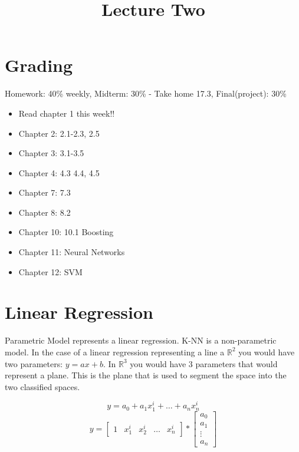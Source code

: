 \documentclass[letter, 9pt]{article}
\title{Lecture Two}
\begin{document}
\maketitle

\section{Grading}
Homework: 40\% weekly, Midterm: 30\% - Take home 17.3, Final(project): 30\%

\begin{itemize}
\item Read chapter 1 this week!!
\item Chapter 2: 2.1-2.3, 2.5
\item Chapter 3: 3.1-3.5
\item Chapter 4: 4.3 4.4, 4.5
\item Chapter 7: 7.3
\item Chapter 8: 8.2
\item Chapter 10: 10.1 Boosting
\item Chapter 11: Neural Networks
\item Chapter 12: SVM
\end{itemize}

\section{Linear Regression}
Parametric Model represents a linear regression. K-NN is a non-parametric model. In the case of a linear regression representing a line a $\mathbb{R}^2$ you would have two parameters: $y = ax + b$. In $\mathbb{R}^3$ you would have $3$ parameters that would represent a plane. This is the plane that is used to segment the space into the two classified spaces.

\begin{equation}
y = a_0 + a_1 x_1^i + \dots + a_n x_n^i
\end{equation}
\begin{equation}
y = \begin{bmatrix} 1 & x_1^i & x_2^i & \dots & x_n^i \end{bmatrix} * \begin{bmatrix} a_0\\a_1\\ \vdots \\ a_n\end{bmatrix}
\end{equation}
\end{document}
